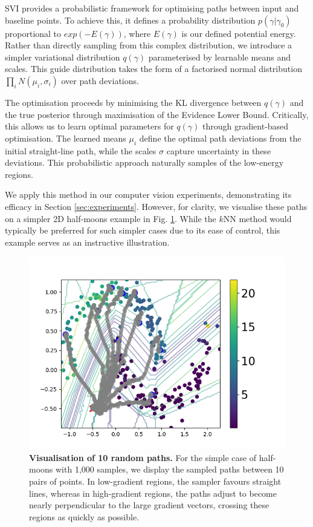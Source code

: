 SVI provides a probabilistic framework for optimising paths between input and baseline points. To achieve this, it defines a probability distribution $p(\gamma|\gamma_0)$ proportional to $exp(-E(\gamma))$, where $E(\gamma)$ is our defined potential energy. Rather than directly sampling from this complex distribution, we introduce a simpler variational distribution $q(\gamma)$ parameterised by learnable means and scales. This guide distribution takes the form of a factorised normal distribution $\prod_i N(\mu_i,\sigma_i)$ over path deviations.

The optimisation proceeds by minimising the KL divergence between $q(\gamma)$ and the true posterior through maximisation of the Evidence Lower Bound. Critically, this allows us to learn optimal parameters for $q(\gamma)$ through gradient-based optimisation. The learned means $\mu_i$ define the optimal path deviations from the initial straight-line path, while the scales $\sigma$ capture uncertainty in these deviations. This probabilistic approach naturally samples of the low-energy regions.

We apply this method in our computer vision experiments, demonstrating its efficacy in Section \ref{sec:experiments}. However, for clarity, we visualise these paths on a simpler 2D half-moons example in Fig. \ref{fig:svi_moons}. While the $k$NN method would typically be preferred for such simpler cases due to its ease of control, this example serves as an instructive illustration.

\begin{figure}[ht]
	\vskip 0.2in
	\begin{center}
		\centerline{\includegraphics[width=\columnwidth]{figures/svi_ig_moons.png}}
		\caption{\textbf{Visualisation of 10 random paths.} For the simple case of half-moons with 1,000 samples, we display the sampled paths between 10 pairs of points. In low-gradient regions, the sampler favours straight lines, whereas in high-gradient regions, the paths adjust to become nearly perpendicular to the large gradient vectors, crossing these regions as quickly as possible.}
		\label{fig:svi_moons}
	\end{center}
	\vskip -0.2in
\end{figure}

